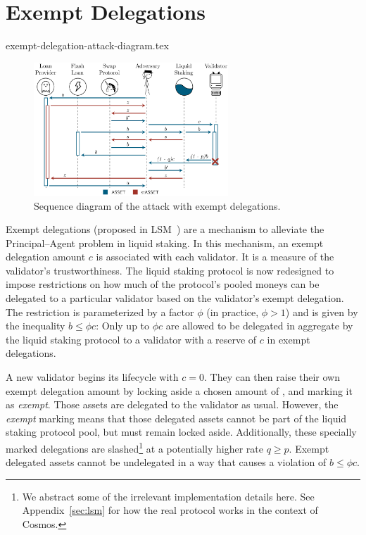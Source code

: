 \section{Exempt Delegations}

\ifccs
  {exempt-delegation-attack-diagram.tex}
\fi

\ifccs
  \begin{figure}[b]
    \centering
    \includegraphics[width=0.65\textwidth]{./figures/sequence-diagram.pdf}
    \caption{Sequence diagram of the attack with exempt delegations.}
    \label{fig:exempt-sequence}
  \end{figure}
\fi

Exempt delegations (proposed in LSM~\cite{liquidity-staking-module})
are a mechanism to alleviate the Principal--Agent problem in liquid staking.
In this mechanism, an exempt delegation amount $c$ \asset is associated
with each validator. It is a measure of the validator's trustworthiness.
The liquid staking protocol is now redesigned to impose restrictions
on how much of the protocol's pooled moneys can be delegated to a particular
validator based on the validator's exempt delegation.
The restriction is
parameterized by a factor $\phi$ (in practice, $\phi > 1$)
and is given by the inequality $b \leq \phi c$: Only up to $\phi c$ \assets
are allowed to be delegated in aggregate by the liquid staking protocol
to a validator with a reserve of $c$ \asset in exempt delegations.

A new validator begins its lifecycle with $c = 0$. They can then
raise their own exempt delegation amount by locking aside a
chosen amount of \asset, and marking it as \emph{exempt}. Those
assets are delegated to the validator as usual. However,
the \emph{exempt}
marking means that those delegated assets cannot be part of the liquid
staking protocol pool, but must remain locked aside. Additionally,
these specially marked delegations are slashed\footnote{We abstract some
of the irrelevant implementation details here. See Appendix~\ref{sec:lsm}
for how the real protocol works in the context of Cosmos.}
at a potentially higher rate $q \geq p$. Exempt delegated assets cannot
be undelegated in a way that causes a violation of $b \leq \phi c$.

